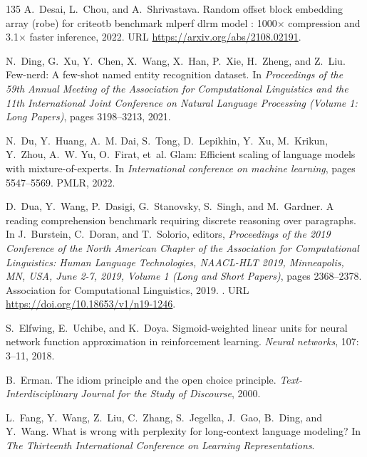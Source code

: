 \begin{thebibliography}{135}
A.~Desai, L.~Chou, and A.~Shrivastava.
\newblock Random offset block embedding array (robe) for criteotb benchmark
  mlperf dlrm model : 1000$\times$ compression and 3.1$\times$ faster
  inference, 2022.
\newblock URL \url{https://arxiv.org/abs/2108.02191}.

N.~Ding, G.~Xu, Y.~Chen, X.~Wang, X.~Han, P.~Xie, H.~Zheng, and Z.~Liu.
\newblock Few-nerd: A few-shot named entity recognition dataset.
\newblock In \emph{Proceedings of the 59th Annual Meeting of the Association
  for Computational Linguistics and the 11th International Joint Conference on
  Natural Language Processing (Volume 1: Long Papers)}, pages 3198--3213, 2021.

N.~Du, Y.~Huang, A.~M. Dai, S.~Tong, D.~Lepikhin, Y.~Xu, M.~Krikun, Y.~Zhou,
  A.~W. Yu, O.~Firat, et~al.
\newblock Glam: Efficient scaling of language models with mixture-of-experts.
\newblock In \emph{International conference on machine learning}, pages
  5547--5569. PMLR, 2022.

D.~Dua, Y.~Wang, P.~Dasigi, G.~Stanovsky, S.~Singh, and M.~Gardner.
 {A} reading comprehension benchmark requiring discrete
  reasoning over paragraphs.
\newblock In J.~Burstein, C.~Doran, and T.~Solorio, editors, \emph{Proceedings
  of the 2019 Conference of the North American Chapter of the Association for
  Computational Linguistics: Human Language Technologies, {NAACL-HLT} 2019,
  Minneapolis, MN, USA, June 2-7, 2019, Volume 1 (Long and Short Papers)},
  pages 2368--2378. Association for Computational Linguistics, 2019.
\newblock {}.
\newblock URL \url{https://doi.org/10.18653/v1/n19-1246}.

S.~Elfwing, E.~Uchibe, and K.~Doya.
\newblock Sigmoid-weighted linear units for neural network function
  approximation in reinforcement learning.
\newblock \emph{Neural networks}, 107: 3--11, 2018.

B.~Erman.
\newblock The idiom principle and the open choice principle.
\newblock \emph{Text-Interdisciplinary Journal for the Study of Discourse},
  2000.

L.~Fang, Y.~Wang, Z.~Liu, C.~Zhang, S.~Jegelka, J.~Gao, B.~Ding, and Y.~Wang.
\newblock What is wrong with perplexity for long-context language modeling?
\newblock In \emph{The Thirteenth International Conference on Learning
  Representations}.


\end{thebibliography}
